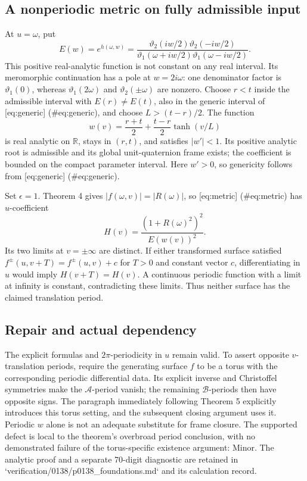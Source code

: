 \documentclass[10pt]{article}
\begin{document}
\subsection*{A nonperiodic metric on fully admissible input}
At \(u=\omega\), put \[E(w)=e^{h(\omega,w)}
 =\frac{\vartheta_2(iw/2)\vartheta_2(-iw/2)}
        {\vartheta_1(\omega+iw/2)\vartheta_1(\omega-iw/2)}.\] This positive real-analytic function is not constant on any real interval. Its meromorphic continuation has a pole at \(w=2i\omega\): one denominator factor is \(\vartheta_1(0)\), whereas \(\vartheta_1(2\omega)\) and \(\vartheta_2(\pm\omega)\) are nonzero. Choose \(r<t\) inside the admissible interval with \(E(r)\ne E(t)\), also in the generic interval of [eq:generic] (\#eq:generic), and choose \(L>(t-r)/2\). The function \[w(v)=\frac{r+t}{2}+\frac{t-r}{2}\tanh(v/L)\] is real analytic on \(\mathbb R\), stays in \((r,t)\), and satisfies \(|w'|<1\). Its positive analytic root is admissible and its global unit-quaternion frame exists; the coefficient is bounded on the compact parameter interval. Here \(w'>0\), so genericity follows from [eq:generic] (\#eq:generic).\par
Set \(\epsilon=1\). Theorem 4 gives \(|f(\omega,v)|=|R(\omega)|\), so [eq:metric] (\#eq:metric) has \(u\)-coefficient \[H(v)=\frac{(1+R(\omega)^2)^2}{E(w(v))^2}.\] Its two limits at \(v=\pm\infty\) are distinct. If either transformed surface satisfied \(f^\pm(u,v+T)=f^\pm(u,v)+c\) for \(T>0\) and constant vector \(c\), differentiating in \(u\) would imply \(H(v+T)=H(v)\). A continuous periodic function with a limit at infinity is constant, contradicting these limits. Thus neither surface has the claimed translation period.\par
\subsection*{Repair and actual dependency}
The explicit formulas and \(2\pi\)-periodicity in \(u\) remain valid. To assert opposite \(v\)-translation periods, require the generating surface \(f\) to be a torus with the corresponding periodic differential data. Its explicit inverse and Christoffel symmetries make the \(\mathcal A\)-period vanish; the remaining \(\mathcal B\)-periods then have opposite signs. The paragraph immediately following Theorem 5 explicitly introduces this torus setting, and the subsequent closing argument uses it. Periodic \(w\) alone is not an adequate substitute for frame closure. The supported defect is local to the theorem’s overbroad period conclusion, with no demonstrated failure of the torus-specific existence argument: Minor. The analytic proof and a separate 70-digit diagnostic are retained in `verification/0138/p0138\_foundations.md` and its calculation record.\par
\end{document}

